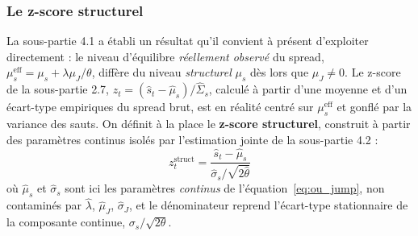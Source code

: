 \documentclass{article}
\begin{document}
\subsubsection*{Le z-score structurel}
La sous-partie 4.1 a établi un résultat qu'il convient à présent d'exploiter directement : le niveau d'équilibre \emph{réellement observé} du spread, $\mu_s^{\text{eff}}=\mu_s+\lambda\mu_J/\theta$, diffère du niveau \emph{structurel} $\mu_s$ dès lors que $\mu_J\neq 0$. Le z-score de la sous-partie 2.7, $z_t=(\hat s_t-\hat\mu_s)/\hat{\Sigma}_s$, calculé à partir d'une moyenne et d'un écart-type empiriques du spread brut, est en réalité centré sur $\mu_s^{\text{eff}}$ et gonflé par la variance des sauts. On définit à la place le \textbf{z-score structurel}, construit à partir des paramètres continus isolés par l'estimation jointe de la sous-partie 4.2 :
\begin{equation}
z_t^{\text{struct}} = \frac{\hat s_t - \hat\mu_s}{\hat\sigma_s/\sqrt{2\hat\theta}}
\end{equation}
où $\hat\mu_s$ et $\hat\sigma_s$ sont ici les paramètres \emph{continus} de l'équation~\eqref{eq:ou_jump}, non contaminés par $\hat\lambda$, $\hat\mu_J$, $\hat\sigma_J$, et le dénominateur reprend l'écart-type stationnaire de la composante continue, $\sigma_s/\sqrt{2\theta}$.
\end{document}
